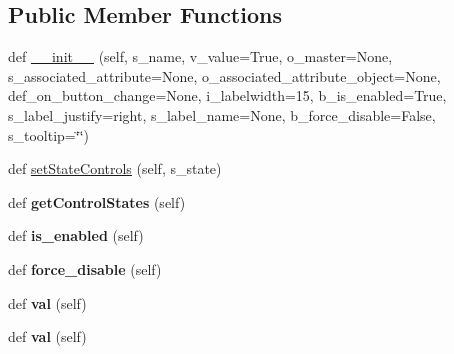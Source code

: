 \subsection*{Public Member Functions}
\begin{DoxyCompactItemize}
\item 
def \hyperlink{classnegui_1_1pgkeycheckboxvalueframe_1_1KeyCheckboxValueFrame_a67edc291a493061206f1bf93ced6137e}{\+\_\+\+\_\+init\+\_\+\+\_\+} (self, s\+\_\+name, v\+\_\+value=True, o\+\_\+master=None, s\+\_\+associated\+\_\+attribute=None, o\+\_\+associated\+\_\+attribute\+\_\+object=None, def\+\_\+on\+\_\+button\+\_\+change=None, i\+\_\+labelwidth=15, b\+\_\+is\+\_\+enabled=True, s\+\_\+label\+\_\+justify=\textquotesingle{}right\textquotesingle{}, s\+\_\+label\+\_\+name=None, b\+\_\+force\+\_\+disable=False, s\+\_\+tooltip=\char`\"{}\char`\"{})
\item 
def \hyperlink{classnegui_1_1pgkeycheckboxvalueframe_1_1KeyCheckboxValueFrame_a40238b6852e83078ef986454da75aaab}{set\+State\+Controls} (self, s\+\_\+state)
\item 
def {\bfseries get\+Control\+States} (self)\hypertarget{classnegui_1_1pgkeycheckboxvalueframe_1_1KeyCheckboxValueFrame_a7e95370cbe2405a45eb03fbcd6538c45}{}\label{classnegui_1_1pgkeycheckboxvalueframe_1_1KeyCheckboxValueFrame_a7e95370cbe2405a45eb03fbcd6538c45}

\item 
def {\bfseries is\+\_\+enabled} (self)\hypertarget{classnegui_1_1pgkeycheckboxvalueframe_1_1KeyCheckboxValueFrame_ae6d65342f8ba05ad56034af485df08d0}{}\label{classnegui_1_1pgkeycheckboxvalueframe_1_1KeyCheckboxValueFrame_ae6d65342f8ba05ad56034af485df08d0}

\item 
def {\bfseries force\+\_\+disable} (self)\hypertarget{classnegui_1_1pgkeycheckboxvalueframe_1_1KeyCheckboxValueFrame_a9d6c98c493c5006d01c681bf5afa773d}{}\label{classnegui_1_1pgkeycheckboxvalueframe_1_1KeyCheckboxValueFrame_a9d6c98c493c5006d01c681bf5afa773d}

\item 
def {\bfseries val} (self)\hypertarget{classnegui_1_1pgkeycheckboxvalueframe_1_1KeyCheckboxValueFrame_ab33583afb366b88cb973443c2528c1cb}{}\label{classnegui_1_1pgkeycheckboxvalueframe_1_1KeyCheckboxValueFrame_ab33583afb366b88cb973443c2528c1cb}

\item 
def {\bfseries val} (self)\hypertarget{classnegui_1_1pgkeycheckboxvalueframe_1_1KeyCheckboxValueFrame_ab33583afb366b88cb973443c2528c1cb}{}\label{classnegui_1_1pgkeycheckboxvalueframe_1_1KeyCheckboxValueFrame_ab33583afb366b88cb973443c2528c1cb}

\end{DoxyCompactItemize}
